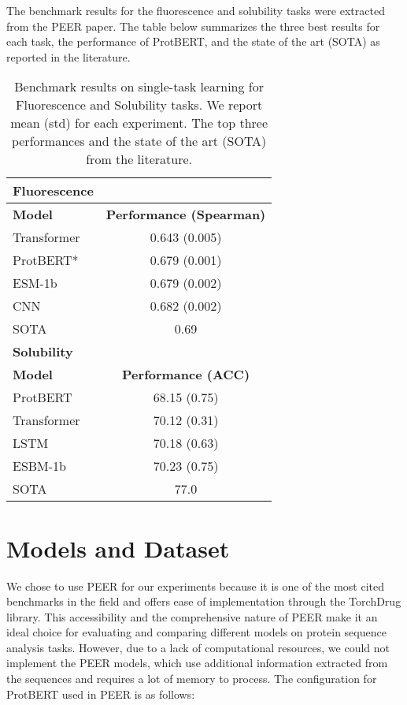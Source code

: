 \documentclass[letterpaper,spanish,reprint,nofootinbib,showkeys,aps]{revtex4-2}
\begin{document}
The benchmark results for the fluorescence and solubility tasks were extracted from the PEER paper. The table below summarizes the three best results for each task, the performance of ProtBERT, and the state of the art (SOTA) as reported in the literature.

   \begin{table}[h]
      \centering
   
      \begin{tabular}{lc}  
      \textbf{Fluorescence}  &    \\
      \hline
      \textbf{Model} & \textbf{Performance (Spearman)}  \\
      \hline
       Transformer & 0.643 (0.005)    \\
       ProtBERT* & 0.679 (0.001)    \\
       ESM-1b & 0.679 (0.002)    \\
       CNN & 0.682 (0.002)    \\
       SOTA   & 0.69   \\
      \hline
      \textbf{Solubility}  &    \\
      \hline
      \textbf{Model} & \textbf{Performance (ACC)} \\
      \hline
       ProtBERT & 68.15 (0.75)  \\
       Transformer & 70.12 (0.31)  \\
       LSTM & 70.18 (0.63)  \\
       ESBM-1b & 70.23 (0.75)  \\
       SOTA & 77.0  \\
      \hline
      \end{tabular}
      \caption{Benchmark results on single-task learning for Fluorescence and Solubility tasks. We report mean (std) for each experiment. The top three performances and the state of the art (SOTA) from the literature.}
   \end{table}

\section{Models and Dataset}

We chose to use PEER for our experiments because it is one of the most cited benchmarks in the field and offers ease of implementation through the TorchDrug library. This accessibility and the comprehensive nature of PEER make it an ideal choice for evaluating and comparing different models on protein sequence analysis tasks. However, due to a lack of computational resources, we could not implement the PEER models, which use additional information extracted from the sequences and requires a lot of memory to process. The configuration for ProtBERT used in PEER is as follows:
\end{document}
